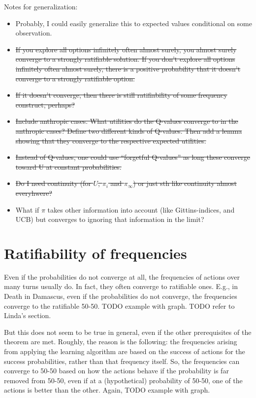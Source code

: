 \documentclass{article}
\begin{document}
Notes for generalization:
\begin{itemize}
\item Probably, I could easily generalize this to expected values conditional on some observation.
\item \sout{If you explore all options infinitely often almost surely, you almost surely converge to a strongly ratifiable solution. If you don't explore all options infinitely often almost surely, there is a positive probability that it doesn't converge to a strongly ratifiable option.}
\item \sout{If it doesn't converge, then there is still ratifiability of some frequency construct, perhaps?}
\item \sout{Include anthropic cases. What utilities do the Q-values converge to in the anthropic cases? Define two different kinds of Q-values. Then add a lemma showing that they converge to the respective expected utilities.}
\item \sout{Instead of Q-values, one could use ``forgetful Q-values'' as long these converge toward U at constant probabilities.}
\item \sout{Do I need continuity (for $U$, $\pi_i$ and $\pi_\infty$) or just sth like continuity almost everyhwere?}
\item What if $\pi$ takes other information into account (like Gittins-indices, and UCB) but converges to ignoring that information in the limit?
\end{itemize}

\section*{Ratifiability of frequencies}

Even if the probabilities do not converge at all, the frequencies of actions over many turns usually do. In fact, they often converge to ratifiable ones.  E.g., in Death in Damascus, even if the probabilities do not converge, the frequencies converge to the ratifiable 50-50. TODO example with graph. TODO refer to Linda's section.

But this does not seem to be true in general, even if the other prerequisites of the theorem are met. Roughly, the reason is the following: the frequencies arising from applying the learning algorithm are based on the success of actions for the success probabilities, rather than that frequency itself. So, the frequencies can converge to 50-50 based on how the actions behave if the probability is far removed from 50-50, even if at a (hypothetical) probability of 50-50, one of the actions is better than the other. Again, TODO example with graph.
\end{document}

